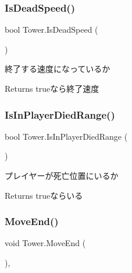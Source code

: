 \subsubsection{\texorpdfstring{Is\+Dead\+Speed()}{IsDeadSpeed()}}
{\footnotesize\ttfamily bool Tower.\+Is\+Dead\+Speed (\begin{DoxyParamCaption}{ }\end{DoxyParamCaption})\hspace{0.3cm}{\ttfamily [inline]}}



終了する速度になっているか 

\begin{DoxyReturn}{Returns}
trueなら終了速度
\end{DoxyReturn}
\mbox{\label{class_tower_afecc60cb00b3fa47cf08b4b49428eceb}} 
\subsubsection{\texorpdfstring{Is\+In\+Player\+Died\+Range()}{IsInPlayerDiedRange()}}
{\footnotesize\ttfamily bool Tower.\+Is\+In\+Player\+Died\+Range (\begin{DoxyParamCaption}{ }\end{DoxyParamCaption})\hspace{0.3cm}{\ttfamily [inline]}}



プレイヤーが死亡位置にいるか 

\begin{DoxyReturn}{Returns}
trueならいる
\end{DoxyReturn}
\mbox{\label{class_tower_a0d51b488f4a8bb8596222b342f48799e}} 
\subsubsection{\texorpdfstring{Move\+End()}{MoveEnd()}}
{\footnotesize\ttfamily void Tower.\+Move\+End (\begin{DoxyParamCaption}{ }\end{DoxyParamCaption})\hspace{0.3cm}{\ttfamily [inline]}, {\ttfamily [private]}}



